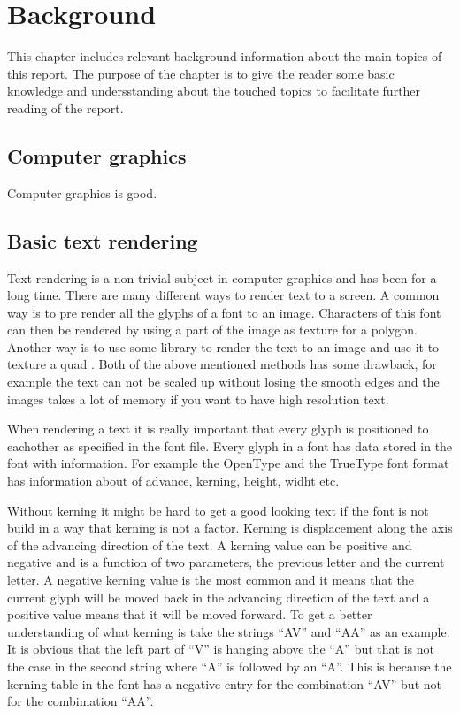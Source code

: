 \chapter{Background}\label{cha:theory}
This chapter includes relevant background information about the main topics of this report. The purpose of the chapter is to give the reader some basic knowledge and undersstanding about the touched topics to facilitate further reading of the report.
\section{Computer graphics}\label{computergraphics}
Computer graphics is good. 
\section{Basic text rendering}\label{textrendering}
Text rendering is a non trivial subject in computer graphics and has been for a long time. There are many different ways to render text to a screen. A common way is to pre render all the glyphs of a font to an image. Characters of this font can then be rendered by using a part of the image as texture for a polygon. Another way is to use some library to render the text to an image and use it to texture a quad \citep{FreeType}. Both of the above mentioned methods has some drawback, for example the text can not be scaled up without losing the smooth edges and the images takes a lot of memory if you want to have high resolution text.

When rendering a text it is really important that every glyph is positioned to eachother as specified in the font file. Every glyph in a font has data stored in the font with information. For example the OpenType and the TrueType\texttrademark{} font format has information about of advance, kerning, height, widht etc\citep{OpenType, TrueType}.

Without kerning it might be hard to get a good looking text if the font is not build in a way that kerning is not a factor. Kerning is displacement along the axis of the advancing direction of the text. A kerning value can be positive and negative and is a function of two parameters, the previous letter and the current letter. A negative kerning value is the most common and it means that the current glyph will be moved back in the advancing direction of the text and a positive value means that it will be moved forward. To get a better understanding of what kerning is take the strings ``AV'' and ``AA'' as an example. It is obvious that the left part of ``V'' is hanging above the ``A'' but that is not the case in the second string where ``A'' is followed by an ``A''. This is because the kerning table in the font has a negative entry for the combination ``AV'' but not for the combimation ``AA''. \citep{FreeTypeKern}

